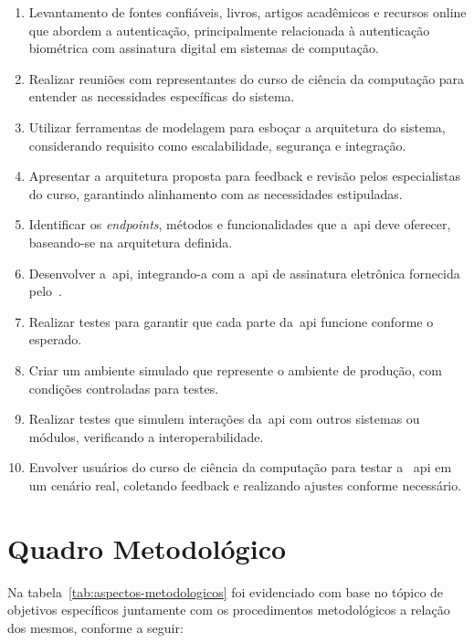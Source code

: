 \begin{enumerate}[label=\arabic*\textdegree\space Etapa:, leftmargin=2cm]
    \item Levantamento de fontes confiáveis, livros, artigos acadêmicos
    e recursos online que abordem a autenticação, principalmente relacionada à
    autenticação biométrica com assinatura digital em sistemas de computação.
    \item Realizar reuniões com representantes do curso de ciência da computação
    para entender as necessidades específicas do sistema.
    \item Utilizar ferramentas de modelagem para esboçar a arquitetura do
    sistema,
    considerando requisito como escalabilidade, segurança e integração.
    \item Apresentar a arquitetura proposta para feedback e revisão pelos
    especialistas do curso,
    garantindo alinhamento com as necessidades estipuladas.
    \item Identificar os \textit{endpoints}, métodos e funcionalidades que a~\acrshort{api}
    deve oferecer, baseando-se na arquitetura definida.
    \item Desenvolver a~\acrshort{api}, integrando-a com a~\acrshort{api} de
    assinatura eletrônica fornecida pelo~\citeauthor*{govbr2020}.
    \item Realizar testes para garantir que cada parte da~\acrshort{api}
    funcione conforme o esperado.
    \item Criar um ambiente simulado que represente o ambiente de produção,
    com condições controladas para testes.
    \item Realizar testes que simulem interações da~\acrshort{api} com outros
    sistemas
    ou módulos, verificando a interoperabilidade.
    \item Envolver usuários do curso de ciência da computação para testar a
    ~\acrshort{api} em um cenário real, coletando feedback e realizando
    ajustes conforme necessário.
\end{enumerate}
\section{Quadro Metodológico}\label{sec:quadro-metodologico}

Na tabela~\ref{tab:aspectos-metodologicos} foi evidenciado com base no
tópico de objetivos específicos juntamente com os procedimentos
metodológicos a relação dos mesmos, conforme a seguir:

